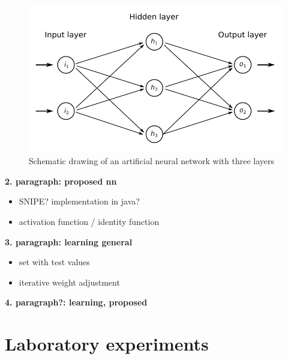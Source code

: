\documentclass[12pt]{scrartcl}
\begin{document}
\begin{figure}[ht]
    \centering
    \includegraphics{figures/neuralnetworks.pdf}
    \caption{Schematic drawing of an artificial neural network with three layers}
    \label{fig:neuralnetwork}
\end{figure}


\textbf{2. paragraph: proposed nn}

\begin{itemize}
\item SNIPE? implementation in java?
\item activation function / identity function
\end{itemize}

\textbf{3. paragraph: learning general}

\begin{itemize}
\item set with test values
\item iterative weight adjustment
\end{itemize}

\textbf{4. paragraph?: learning, proposed}



\newpage
\section*{Laboratory experiments}
\end{document}
